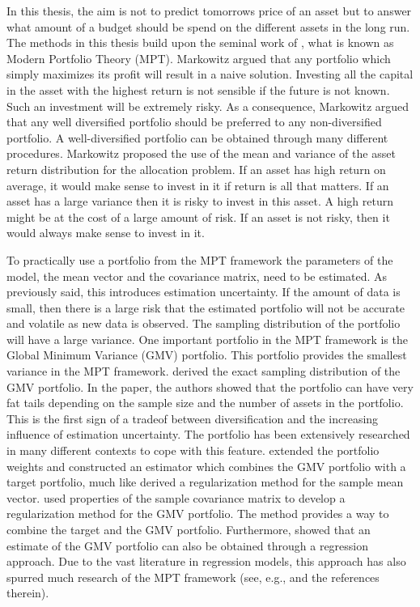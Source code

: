In this thesis, the aim is not to predict tomorrows price of an asset but to answer what amount of a budget should be spend on the different assets in the long run.
The methods in this thesis build upon the seminal work of \citet{markowitz1959portfolio}, what is known as Modern Portfolio Theory (MPT).
Markowitz argued that any portfolio which simply maximizes its profit will result in a naive solution.
Investing all the capital in the asset with the highest return is not sensible if the future is not known.
Such an investment will be extremely risky. 
As a consequence, Markowitz argued that any well diversified portfolio should be preferred to any non-diversified portfolio. 
A well-diversified portfolio can be obtained through many different procedures.
Markowitz proposed the use of the mean and variance of the asset return distribution for the allocation problem.
If an asset has high return on average, it would make sense to invest in it if return is all that matters.
If an asset has a large variance then it is risky to invest in this asset. 
A high return might be at the cost of a large amount of risk.
If an asset is not risky, then it would always make sense to invest in it.

To practically use a portfolio from the MPT framework the parameters of the model, the mean vector and the covariance matrix, need to be estimated.
As previously said, this introduces estimation uncertainty.
If the amount of data is small, then there is a large risk that the estimated portfolio will not be accurate and volatile as new data is observed.
The sampling distribution of the portfolio will have a large variance.
One important portfolio in the MPT framework is the Global Minimum Variance (GMV) portfolio.
This portfolio provides the smallest variance in the MPT framework.
\citet{okhrin2006distributional} derived the exact sampling distribution of the GMV portfolio. 
In the paper, the authors showed that the portfolio can have very fat tails depending on the sample size and the number of assets in the portfolio.
This is the first sign of a tradeof between diversification and the increasing influence of estimation uncertainty.
The portfolio has been extensively researched in many different contexts to cope with this feature.
\citet{frahm2010} extended the portfolio weights and constructed an estimator which combines the GMV portfolio with a target portfolio, much like \citet{stein1956} derived a regularization method for the sample mean vector. 
\citet{frahm2010} used properties of the sample covariance matrix to develop a regularization method for the GMV portfolio.
The method provides a way to combine the target and the GMV portfolio.
Furthermore, \citet{kempf2006estimating} showed that an estimate of the GMV portfolio can also be obtained through a regression approach.
Due to the vast literature in regression models, this approach has also spurred much research of the MPT framework (see, e.g., \citet{maillet2015global} and the references therein).

